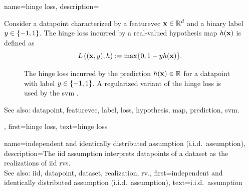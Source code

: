 {name={hinge loss}, 
	description={Consider a \gls{datapoint} 
		characterized by a \gls{featurevec} ${\bf x} \in \mathbb{R}^{d}$ and a 
		binary \gls{label} $y \in \{-1,1\}$. The hinge \gls{loss} incurred by a real-valued 
		\gls{hypothesis} \gls{map} $h({\bf x})$ is defined as 
		\begin{equation} 
			\label{equ_hinge_loss_gls_dict}
				L\left(({\bf x},y),h \right) := \max \{ 0 , 1 - y h({\bf x}) \}. 
			\end{equation}
\begin{figure}[H]
\begin{center}
\caption{The hinge \gls{loss} incurred by the \gls{prediction} $h({\bf x}) \in \mathbb{R}$ 
for a \gls{datapoint} with \gls{label} $y \in \{-1,1\}$. A regularized variant of the hinge 
\gls{loss} is used by the \gls{svm} \cite{LampertNowKernel}.}
\label{fig_hingeloss_dict}
\end{center}
\end{figure} 	    
		See also: \gls{datapoint}, \gls{featurevec}, \gls{label}, \gls{loss}, \gls{hypothesis}, \gls{map}, \gls{prediction}, \gls{svm}.},
	first={hinge loss},
	text={hinge loss}
}

{name={independent and identically distributed assumption (i.i.d.\ assumption)}, 
	description={The \gls{iid} assumption interprets \glspl{datapoint} of a \gls{dataset} as the 
		\glspl{realization} of \gls{iid} \glspl{rv}.
				\\
		See also: \gls{iid}, \gls{datapoint}, \gls{dataset}, \gls{realization}, \gls{rv}.},
	first={independent and identically distributed assumption (i.i.d.\ assumption)},
	text={i.i.d.\ assumption} 
}

